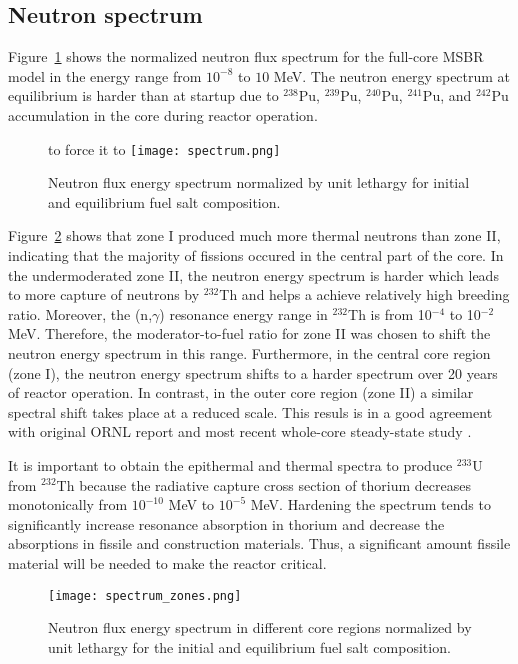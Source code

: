 \subsection{Neutron spectrum}
Figure~\ref{fig:spectrum} shows the normalized neutron flux spectrum for the 
full-core \gls{MSBR} model in the energy range from $10^{-8}$ to $10$ MeV. The 
neutron energy spectrum at equilibrium is harder than at startup due to 
$^{238}$Pu, $^{239}$Pu, $^{240}$Pu, $^{241}$Pu, and $^{242}$Pu accumulation in 
the core during reactor operation.  \begin{figure}[ht!] %
        to force it to \centering
  \texttt{[image: spectrum.png]} \caption{Neutron flux energy 
  spectrum normalized by unit lethargy for initial and equilibrium fuel salt 
  composition.}
  \label{fig:spectrum}
\end{figure}
Figure~\ref{fig:spectrum_zones} shows that zone I produced much more thermal 
neutrons than zone II, indicating that the majority of fissions occured in the 
central part of the core. In the undermoderated zone II, the neutron energy 
spectrum is harder which leads to more capture of neutrons by $^{232}$Th and 
helps a achieve relatively high breeding ratio. Moreover, the (n,$\gamma$) 
resonance energy range in $^{232}$Th is from 10$^{-4}$ to 10$^{-2}$ MeV. 
Therefore, the moderator-to-fuel ratio for zone II was chosen to shift the 
neutron energy spectrum in this range. Furthermore, in the central core region 
(zone I), the neutron energy spectrum shifts to a harder spectrum over 20 years 
of reactor operation. In contrast, in the outer core region (zone II) a similar 
spectral shift takes place at a reduced scale. This resuls is in a good 
agreement with original ORNL report \cite{robertson_conceptual_1971} and most 
recent whole-core steady-state study \cite{park_whole_2015}.

It is important to obtain the epithermal and thermal spectra to produce 
$^{233}$U from $^{232}$Th because the radiative capture cross section of 
thorium decreases monotonically from $10^{-10}$ MeV to $10^{-5}$ MeV. Hardening 
the spectrum tends to significantly increase resonance absorption in thorium 
and decrease the absorptions in fissile and construction materials. Thus, a 
significant amount fissile material will be needed to make the reactor 
critical.  \begin{figure}[ht!] %
  \texttt{[image: spectrum\_zones.png]} \caption{Neutron flux 
  energy spectrum in different core regions normalized by unit lethargy for the 
  initial and equilibrium fuel salt composition.}
  \label{fig:spectrum_zones}
\end{figure}

